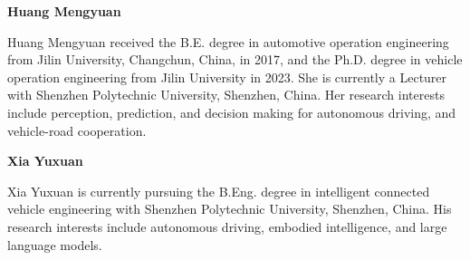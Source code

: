 \documentclass[journal]{IEEEtran}
\begin{document}
\noindent\textbf{Huang Mengyuan}\par\noindent Huang Mengyuan received the B.E. degree in automotive operation engineering from Jilin University, Changchun, China, in 2017, and the Ph.D. degree in vehicle operation engineering from Jilin University in 2023. She is currently a Lecturer with Shenzhen Polytechnic University, Shenzhen, China. Her research interests include perception, prediction, and decision making for autonomous driving, and vehicle-road cooperation.

\noindent\textbf{Xia Yuxuan}\par\noindent Xia Yuxuan is currently pursuing the B.Eng. degree in intelligent connected vehicle engineering with Shenzhen Polytechnic University, Shenzhen, China. His research interests include autonomous driving, embodied intelligence, and large language models.
\end{document}
